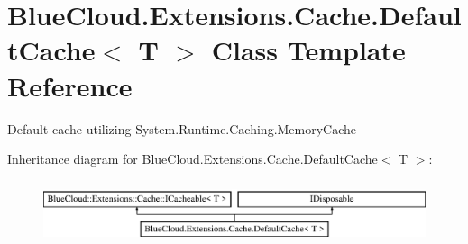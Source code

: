\hypertarget{class_blue_cloud_1_1_extensions_1_1_cache_1_1_default_cache}{}\section{Blue\+Cloud.\+Extensions.\+Cache.\+Default\+Cache$<$ T $>$ Class Template Reference}
\label{class_blue_cloud_1_1_extensions_1_1_cache_1_1_default_cache}


Default cache utilizing System.\+Runtime.\+Caching.\+Memory\+Cache  


Inheritance diagram for Blue\+Cloud.\+Extensions.\+Cache.\+Default\+Cache$<$ T $>$\+:\begin{figure}[H]
\begin{center}
\leavevmode
\includegraphics[height=1.898305cm]{class_blue_cloud_1_1_extensions_1_1_cache_1_1_default_cache}
\end{center}
\end{figure}
